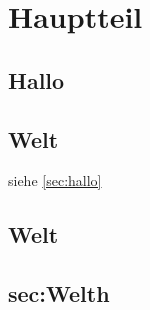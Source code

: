 \chapter{Hauptteil}\label{cha:Hauptteil}
\section{Hallo}\label{sec:Halloh}

\blindtext[20]


\section{Welt}\label{sec:Halloh2}


siehe \ref{sec:hallo}


\blindtext[20]


\section{Welt}\section{sec:Welth}

\blindtext[20]
